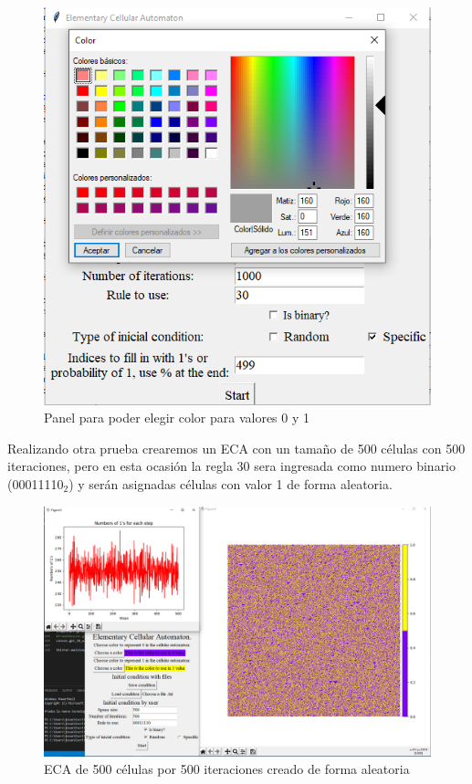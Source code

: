 \documentclass[11pt]{article}
\begin{document}
		\begin{figure}[H]
			\centering
			\includegraphics[scale=0.5]{resources/elegirColor.png}
			\caption{Panel para poder elegir color para valores 0 y 1}\label{fig:picture}
		\end{figure}
		Realizando otra prueba crearemos un ECA con un tamaño de 500 células con 500 iteraciones, pero en esta ocasión la regla 30 sera ingresada como numero binario (00011110$_2$) y serán asignadas células con valor 1 de forma aleatoria.
		\begin{figure}[H]
			\centering
			\includegraphics[scale=0.42]{resources/pruebaF.png}
			\caption{ECA de 500 células por 500 iteraciones creado de forma aleatoria}								\label{fig:picture}
		\end{figure}
\end{document}
